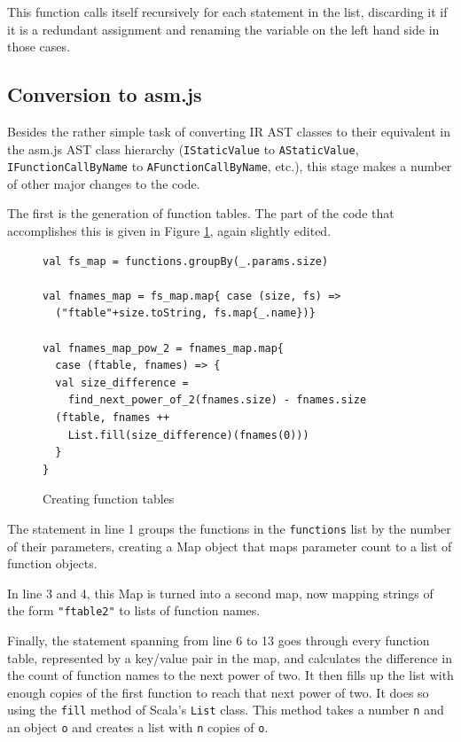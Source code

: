 \documentclass[11pt]{report}
\begin{document}
This function calls itself recursively for each statement in the list, discarding it if it is a redundant assignment and renaming the variable on the left hand side in those cases.

\subsection{Conversion to asm.js}
Besides the rather simple task of converting IR AST classes to their equivalent in the asm.js AST class hierarchy (\texttt{IStaticValue} to \texttt{AStatic\-Value}, \texttt{IFunctionCallByName} to \texttt{AFunctionCallByName}, etc.), this stage makes a number of other major changes to the code.

The first is the generation of function tables. The part of the code that accomplishes this is given in Figure \ref{iconvasmjs1}, again slightly edited.

\begin{figure}[ht]
\begin{lstlisting}
val fs_map = functions.groupBy(_.params.size)

val fnames_map = fs_map.map{ case (size, fs) => 
  ("ftable"+size.toString, fs.map{_.name})}
  
val fnames_map_pow_2 = fnames_map.map{ 
  case (ftable, fnames) => {
  val size_difference = 
    find_next_power_of_2(fnames.size) - fnames.size
  (ftable, fnames ++ 
    List.fill(size_difference)(fnames(0)))
  }
}
\end{lstlisting}
\caption{Creating function tables}
\label{iconvasmjs1}
\end{figure}

The statement in line 1 groups the functions in the \texttt{functions} list by the number of their parameters, creating a Map object that maps parameter count to a list of function objects.

In line 3 and 4, this Map is turned into a second map, now mapping strings of the form \texttt{"ftable2"} to lists of function names.

Finally, the statement spanning from line 6 to 13 goes through every function table, represented by a key/value pair in the map, and calculates the difference in the count of function names to the next power of two. It then fills up the list with enough copies of the first function to reach that next power of two. It does so using the \texttt{fill} method of Scala's \texttt{List} class. This method takes a number \texttt{n} and an object \texttt{o} and creates a list with \texttt{n} copies of \texttt{o}.
\end{document}
